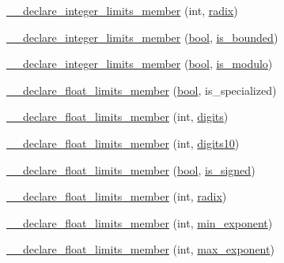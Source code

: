 \begin{DoxyCompactItemize}
\item 
\hyperlink{limits-hack_8h_a7795ceb08900bb8d9cee023078ecc057}{\+\_\+\+\_\+declare\+\_\+integer\+\_\+limits\+\_\+member} (int, \hyperlink{numinquire_8h_a7f3f274d8e16df7db5fb23c81be22170}{radix})
\item 
\hyperlink{limits-hack_8h_ac80db2f30053194c6ee412a7414d24f5}{\+\_\+\+\_\+declare\+\_\+integer\+\_\+limits\+\_\+member} (\hyperlink{compiler_8h_abb452686968e48b67397da5f97445f5b}{bool}, \hyperlink{numinquire_8h_a76c822eea59ab5dacbd0bc2d94d94928}{is\+\_\+bounded})
\item 
\hyperlink{limits-hack_8h_aceb97ba235e8cf40c0917e843c35490b}{\+\_\+\+\_\+declare\+\_\+integer\+\_\+limits\+\_\+member} (\hyperlink{compiler_8h_abb452686968e48b67397da5f97445f5b}{bool}, \hyperlink{numinquire_8h_a7fda08f95601cec6a8b3588a5fd0c333}{is\+\_\+modulo})
\item 
\hyperlink{limits-hack_8h_a69892a29bc51a25fe312a06349312656}{\+\_\+\+\_\+declare\+\_\+float\+\_\+limits\+\_\+member} (\hyperlink{compiler_8h_abb452686968e48b67397da5f97445f5b}{bool}, is\+\_\+specialized)
\item 
\hyperlink{limits-hack_8h_a2d7881ef2f7e68fab2244588c8f04e6b}{\+\_\+\+\_\+declare\+\_\+float\+\_\+limits\+\_\+member} (int, \hyperlink{numinquire_8h_a76a0faf7aefa53527cce92a7a96d8e07}{digits})
\item 
\hyperlink{limits-hack_8h_a583b46dfb1c539a75aa9733243336826}{\+\_\+\+\_\+declare\+\_\+float\+\_\+limits\+\_\+member} (int, \hyperlink{numinquire_8h_aba621087a8b1529462d180fa6cac4a5d}{digits10})
\item 
\hyperlink{limits-hack_8h_aa794bec873a86435d0e4ec06db9b2c05}{\+\_\+\+\_\+declare\+\_\+float\+\_\+limits\+\_\+member} (\hyperlink{compiler_8h_abb452686968e48b67397da5f97445f5b}{bool}, \hyperlink{numinquire_8h_ae60c5a6ee78f454551ef8a312fb9479c}{is\+\_\+signed})
\item 
\hyperlink{limits-hack_8h_ac4592a810988b8789bd2266559fae57d}{\+\_\+\+\_\+declare\+\_\+float\+\_\+limits\+\_\+member} (int, \hyperlink{numinquire_8h_a7f3f274d8e16df7db5fb23c81be22170}{radix})
\item 
\hyperlink{limits-hack_8h_a8000a6776d985aa7d3a8e255fb88dd92}{\+\_\+\+\_\+declare\+\_\+float\+\_\+limits\+\_\+member} (int, \hyperlink{numinquire_8h_ac302226dab4d3e25159a46f68a5d1522}{min\+\_\+exponent})
\item 
\hyperlink{limits-hack_8h_aa3e418f27230be8478785601d0efd34d}{\+\_\+\+\_\+declare\+\_\+float\+\_\+limits\+\_\+member} (int, \hyperlink{numinquire_8h_a0d191d85c06341ded93a22c602f0604b}{max\+\_\+exponent})

\end{DoxyCompactItemize}
